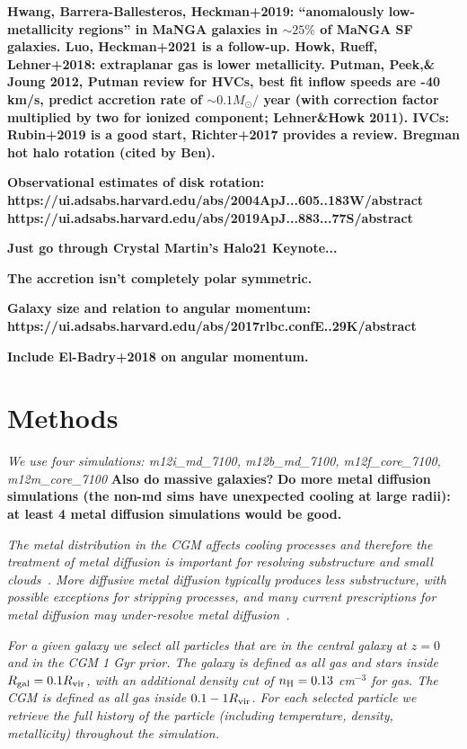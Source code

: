 \documentclass[fleqn,usenatbib]{mnras}
\begin{document}
\textbf{
Hwang, Barrera-Ballesteros, Heckman+2019: ``anomalously low-metallicity regions'' in MaNGA galaxies in $\sim 25\%$ of MaNGA SF galaxies. Luo, Heckman+2021 is a follow-up.
Howk, Rueff, Lehner+2018: extraplanar gas is lower metallicity.
Putman, Peek,\& Joung 2012, Putman review for HVCs, best fit inflow speeds are -40 km/s, predict accretion rate of $\sim 0.1 M_\odot/$ year (with correction factor multiplied by two for ionized component; Lehner\&Howk 2011).
IVCs: Rubin+2019 is a good start, Richter+2017 provides a review.
Bregman hot halo rotation (cited by Ben).
}

\textbf{
Observational estimates of disk rotation:
https://ui.adsabs.harvard.edu/abs/2004ApJ...605..183W/abstract
https://ui.adsabs.harvard.edu/abs/2019ApJ...883...77S/abstract
}

\textbf{Just go through Crystal Martin's Halo21 Keynote...}

\textbf{The accretion isn't completely polar symmetric.}

\textbf{Galaxy size and relation to angular momentum:
https://ui.adsabs.harvard.edu/abs/2017rlbc.confE..29K/abstract}

\textbf{
Include El-Badry+2018 on angular momentum.
}

\section{Methods}
\label{s: methods}

\textit{
We use four simulations:
m12i\_md\_7100, m12b\_md\_7100, m12f\_core\_7100, m12m\_core\_7100
}
\textbf{Also do massive galaxies?}
\textbf{Do more metal diffusion simulations (the non-md sims have unexpected cooling at large radii): at least 4 metal diffusion simulations would be good.}

\textit{
The metal distribution in the CGM affects cooling processes and therefore the treatment of metal diffusion is important for resolving substructure and small clouds~\cite{rennehan2021}.
More diffusive metal diffusion typically produces less substructure, with possible exceptions for stripping processes, and many current prescriptions for metal diffusion may under-resolve metal diffusion~\citep[e.g.][]{rennehan2019, rennehan2021}.
}

\textit{
For a given galaxy we select all particles that are in the central galaxy at $z=0$ and in the CGM 1 Gyr prior.
The galaxy is defined as all gas and stars inside $R_{\rm gal} = 0.1 R_{\rm vir}$, with an additional density cut of $n_{\rm H} = 0.13$ cm$^{-3}$ for gas.
The CGM is defined as all gas inside $0.1 -1 R_{\rm vir}$.
For each selected particle we retrieve the full history of the particle (including temperature, density, metallicity) throughout the simulation.
}
\end{document}
